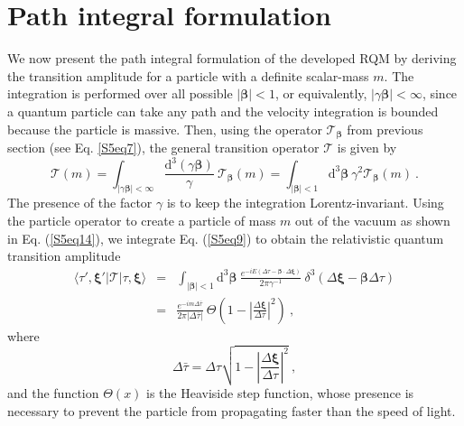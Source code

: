 \documentclass[12pt]{iopart}
\begin{document}
\section{Path integral formulation}

We now present the path integral formulation of the developed RQM by deriving the transition 
amplitude for a particle with a definite scalar-mass $m$. The integration is performed over all 
possible $\vert\boldsymbol{\beta}\vert<1$, or equivalently,  $\vert\gamma\boldsymbol{\beta}
\vert<\infty$, since a quantum particle can take any path and the velocity integration is bounded 
because the particle is massive.  Then, using the operator $\mathcal{T}_{\boldsymbol{\beta}}$
from previous section (see Eq. \ref{S5eq7}), the general transition operator $\mathcal{T}$ is 
given by
%
    \begin{equation}
        \mathcal{T}(m)=\int_{\vert\gamma\boldsymbol{\beta}\vert<\infty}\frac{\mathrm{d}^3
        (\gamma\boldsymbol{\beta})}{\gamma}\ \mathcal{T}_{\boldsymbol{\beta}}(m)=
        \int_{\vert\boldsymbol{\beta}\vert<1}\mathrm{d}^3\boldsymbol{\beta}\ \gamma^2
        \mathcal{T}_{\boldsymbol{\beta}}(m)\ .
        \label{S6eq1}
    \end{equation}
%
The presence of the factor $\gamma$ is to keep the integration Lorentz-invariant.  Using 
the particle operator to create a particle of mass $m$ out of the vacuum as shown in Eq. 
(\ref{S5eq14}), we integrate Eq. (\ref{S5eq9}) to obtain the relativistic quantum transition 
amplitude 
%
    \begin{eqnarray}
        \langle \tau',\boldsymbol{\xi}'\vert\mathcal{T}\vert\tau,
        \boldsymbol{\xi}\rangle&=&\int_{\vert\boldsymbol{\beta}\vert<1}\mathrm
        {d}^3\boldsymbol{\beta}\ \frac{e^{-iE\left(\Delta\tau-\boldsymbol{\beta}
        \cdot\Delta\boldsymbol{\xi}\right)}}{2\pi\gamma^{-1}}\ \delta^3
        \left(\Delta\boldsymbol{\xi}-\boldsymbol{\beta}\Delta\tau\right)\nonumber\\&=&
        \frac{e^{-im\Delta\bar{\tau}}}{2\pi\left\vert\Delta\bar{\tau}\right\vert}\ 
        \Theta\left(1-\left\vert\frac{\Delta\boldsymbol{\xi}}{\Delta\tau}\right\vert^2\right)\ ,
        \label{S6eq2}
    \end{eqnarray}
%
where
%
    \begin{equation}
        \Delta\bar{\tau}=\Delta\tau\sqrt{1-\left\vert\frac{\Delta\boldsymbol{\xi}}
        {\Delta\tau}\right\vert^2}\ ,
        \label{S6eq3}
    \end{equation}
%
and the function $\Theta(x)$ is the Heaviside step function, whose presence 
is necessary to prevent the particle from propagating faster than the speed of light. 
\end{document}
